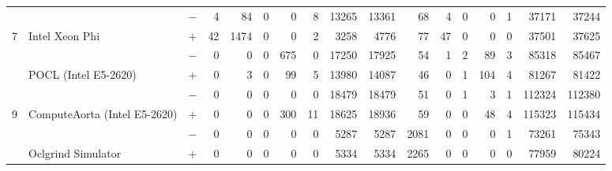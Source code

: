 \begin{tabular}{| lll | rrrrrrr | rrrrrrr |}
  & & $-$ & 4 & 84 & 0 & 0 & 8 & 13265 & 13361 & 68 & 4 & 0 & 0 & 1 & 37171 & 37244 \\
  \multirow{-2}{*}{7} & \multirow{-2}{*}{Intel Xeon Phi} & $+$ & 42 & 1474 & 0 & 0 & 2 & 3258 & 4776 & 77 & 47 & 0 & 0 & 0 & 37501 & 37625 \\
  \rowcolor{gray!25}
  & & $-$ & 0 & 0 & 0 & 675 & 0 & 17250 & 17925 & 54 & 1 & 2 & 89 & 3 & 85318 & 85467 \\
  \rowcolor{gray!25}
  \multirow{-2}{*}{8} & \multirow{-2}{*}{POCL (Intel E5-2620)} & $+$ & 0 & 3 & 0 & 99 & 5 & 13980 & 14087 & 46 & 0 & 1 & 104 & 4 & 81267 & 81422 \\
  & & $-$ & 0 & 0 & 0 & 0 & 0 & 18479 & 18479 & 51 & 0 & 1 & 3 & 1 & 112324 & 112380 \\
  \multirow{-2}{*}{9} & \multirow{-2}{*}{ComputeAorta (Intel E5-2620)} & $+$ & 0 & 0 & 0 & 300 & 11 & 18625 & 18936 & 59 & 0 & 0 & 48 & 4 & 115323 & 115434 \\
  \rowcolor{gray!25}
  & & $-$ & 0 & 0 & 0 & 0 & 0 & 5287 & 5287 & 2081 & 0 & 0 & 0 & 1 & 73261 & 75343 \\
  \rowcolor{gray!25}
  \multirow{-2}{*}{10} & \multirow{-2}{*}{Oclgrind Simulator} & $+$ & 0 & 0 & 0 & 0 & 0 & 5334 & 5334 & 2265 & 0 & 0 & 0 & 0 & 77959 & 80224 \\
  \hline
\end{tabular}
